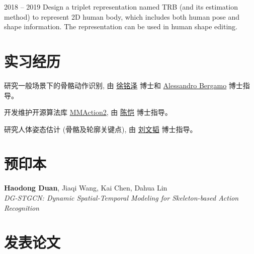 \documentclass{resume}
\begin{document}
\vspace{-2mm}

 {2018 -- 2019}
Design a triplet representation named TRB (and its estimation method) to represent 2D human body, which includes both human pose and shape information. The representation can be used in human shape editing.

\vspace{-2mm}

\section{实习经历}

研究一般场景下的骨骼动作识别, 由 \href{https://xumingze0308.github.io/}{徐铭泽} 博士和 \href{https://alessandrobergamo.com/}{Alessandro Bergamo} 博士指导。

\vspace{-2mm}

开发维护开源算法库 \href{https://github.com/open-mmlab/mmaction2}{MMAction2}, 由 \href{https://chenkai.site/}{陈恺} 博士指导。

\vspace{-2mm}

研究人体姿态估计 (骨骼及轮廓关键点), 由 \href{https://scholar.google.com/citations?user=KZn9NWEAAAAJ}{刘文韬} 博士指导。

\vspace{-2mm}



\section{预印本}

\textbf{Haodong Duan}, Jiaqi Wang, Kai Chen, Dahua Lin \\
\emph{DG-STGCN: Dynamic Spatial-Temporal Modeling for Skeleton-based Action Recognition} \\

\vspace{-2mm}

\section{发表论文}
\end{document}
